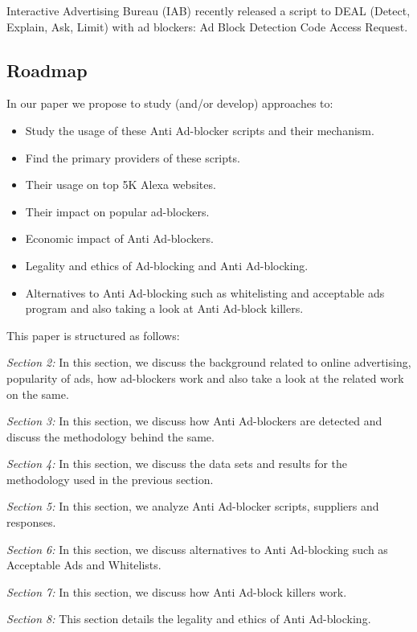 \documentclass[runningheads,a4paper]{llncs}
\begin{document}
Interactive Advertising Bureau (IAB) recently released a script to DEAL (Detect, Explain, Ask, Limit) with ad blockers: Ad Block Detection Code Access Request.\cite{IAB2017}

\subsection{Roadmap}
In our paper we propose to study (and/or develop) approaches to:
\begin{itemize}
	\item Study the usage of these Anti Ad-blocker scripts and their mechanism.
	\item Find the primary providers of these scripts.
	\item Their usage on top 5K Alexa websites.\cite{Rishab2016}
	\item Their impact on popular ad-blockers.
	\item Economic impact of Anti Ad-blockers.\cite{TechCrunch2016}
	\item Legality and ethics of Ad-blocking and Anti Ad-blocking.
	\item Alternatives to Anti Ad-blocking such as whitelisting and acceptable ads program and also taking a look at Anti Ad-block killers.
    
\end{itemize}


This paper is structured as follows:

\textit{Section 2:} In this section, we discuss the background related to online advertising, popularity of ads, how ad-blockers work and also take a look at the related work on the same.

\textit{Section 3:} In this section, we discuss how Anti Ad-blockers are detected and discuss the methodology behind the same.

\textit{Section 4:} In this section, we discuss the data sets and results for the methodology used in the previous section.

\textit{Section 5:} In this section, we analyze Anti Ad-blocker scripts, suppliers and responses.

\textit{Section 6:} In this section, we discuss alternatives to Anti Ad-blocking such as Acceptable Ads and Whitelists.

\textit{Section 7:} In this section, we discuss how Anti Ad-block killers work.

\textit{Section 8:} This section details the legality and ethics of Anti Ad-blocking.
\end{document}
